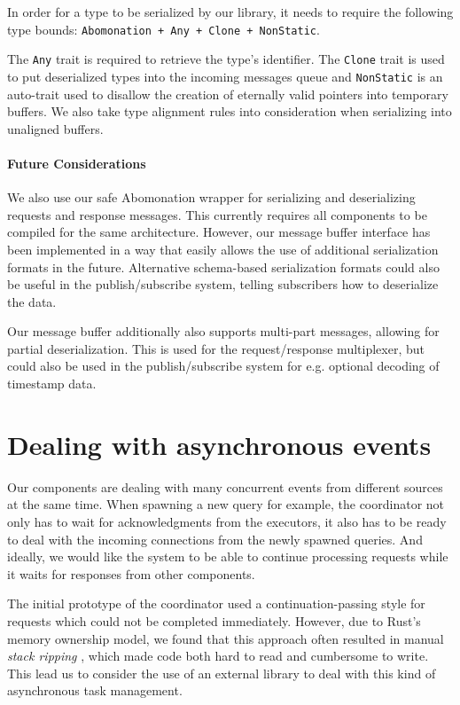 In order for a type to be serialized by our library, it needs to require the
following type bounds: \lstinline{Abomonation + Any + Clone + NonStatic}.

The \lstinline{Any} trait is required to retrieve the type's identifier. The
\lstinline{Clone} trait is used to put deserialized types into the incoming
messages queue and \lstinline{NonStatic} is an auto-trait used to disallow the
creation of eternally valid pointers into temporary buffers. We also take type
alignment rules into consideration when serializing into unaligned buffers. 

\paragraph{Future Considerations}

We also use our safe Abomonation wrapper for serializing and
deserializing requests and response messages. This currently requires all
components to be compiled for the same architecture. However, our message buffer
interface has been implemented in a way that easily allows the use of additional
serialization formats in the future. Alternative schema-based serialization
formats could also be useful in the publish/subscribe system, telling subscribers
how to deserialize the data.

Our message buffer additionally also supports multi-part messages, allowing
for partial deserialization. This is used for the request/response multiplexer,
but could also be used in the publish/subscribe system for e.g. optional
decoding of timestamp data.

\section{Dealing with asynchronous events}

Our components are dealing with many concurrent events from different sources
at the same time. When spawning a new query for example, the coordinator not
only has to wait for acknowledgments from the executors, it also has to be
ready to deal with the incoming connections from the newly spawned queries. And
ideally, we would like the system to be able to continue processing requests
while it waits for responses from other components.

The initial prototype of the coordinator used a continuation-passing style
for requests which could not be completed immediately. However, due to
Rust's memory ownership model, we found that this approach often resulted
in manual \emph{stack ripping} \cite{stackmgmt}, which made code both
hard to read and cumbersome to write. This lead us to consider the use of an
external library to deal with this kind of asynchronous task management.

